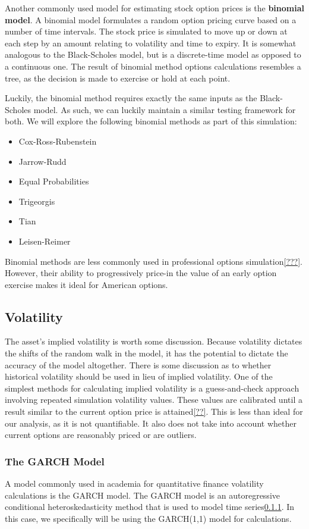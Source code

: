 Another commonly used model for estimating stock option prices is the \textbf{binomial model}. A binomial model formulates a random option pricing curve based on a number of time intervals. The stock price is simulated to move up or down at each step by an amount relating to volatility and time to expiry. It is somewhat analogous to the Black-Scholes model, but is a discrete-time model as opposed to a continuous one. The result of binomial method options calculations resembles a tree, as the decision is made to exercise or hold at each point.

Luckily, the binomial method requires exactly the same inputs as the Black-Scholes model. As such, we can luckily maintain a similar testing framework for both. We will explore the following binomial methods as part of this simulation:

\begin{itemize}
\item{Cox-Ross-Rubenstein}
\item{Jarrow-Rudd}
\item{Equal Probabilities}
\item{Trigeorgis}
\item{Tian}
\item{Leisen-Reimer}
\end{itemize}

Binomial methods are less commonly used in professional options simulation\ref{???}. However, their ability to progressively price-in the value of an early option exercise makes it ideal for American options. 

\subsection{Volatility}
The asset's implied volatility is worth some discussion. Because volatility dictates the shifts of the random walk in the model, it has the potential to dictate the accuracy of the model altogether. There is some discussion as to whether historical volatility should be used in lieu of implied volatility. One of the simplest methods for calculating implied volatility is a guess-and-check approach involving repeated simulation volatility values. These values are calibrated until a result similar to the current option price is attained\ref{??}. This is less than ideal for our analysis, as it is not quantifiable. It also does not take into account whether current options are reasonably priced or are outliers.
\subsubsection{The GARCH Model}
A model commonly used in academia for quantitative finance volatility calculations is the GARCH model. The GARCH model is an autoregressive conditional heteroskedasticity method that is used to model time series\ref{}. In this case, we specifically will be using the GARCH(1,1) model for calculations. 

